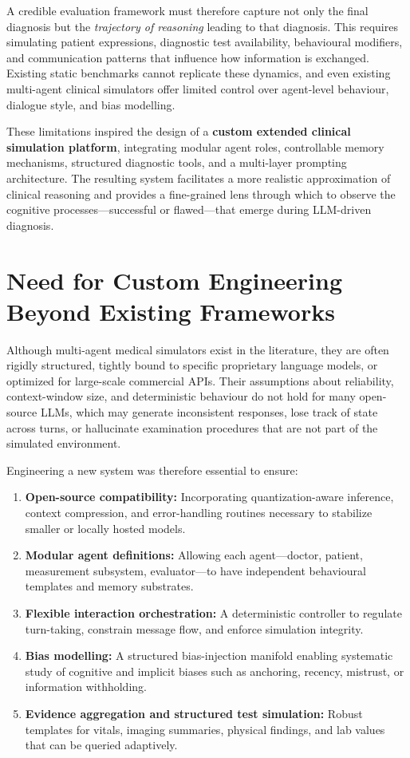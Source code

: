 A credible evaluation framework must therefore capture not only the final diagnosis but the \textit{trajectory of reasoning} leading to that diagnosis. This requires simulating patient expressions, diagnostic test availability, behavioural modifiers, and communication patterns that influence how information is exchanged. Existing static benchmarks cannot replicate these dynamics, and even existing multi-agent clinical simulators offer limited control over agent-level behaviour, dialogue style, and bias modelling.

These limitations inspired the design of a \textbf{custom extended clinical simulation platform}, integrating modular agent roles, controllable memory mechanisms, structured diagnostic tools, and a multi-layer prompting architecture. The resulting system facilitates a more realistic approximation of clinical reasoning and provides a fine-grained lens through which to observe the cognitive processes—successful or flawed—that emerge during LLM-driven diagnosis.

\section{Need for Custom Engineering Beyond Existing Frameworks}

Although multi-agent medical simulators exist in the literature, they are often rigidly structured, tightly bound to specific proprietary language models, or optimized for large-scale commercial APIs. Their assumptions about reliability, context-window size, and deterministic behaviour do not hold for many open-source LLMs, which may generate inconsistent responses, lose track of state across turns, or hallucinate examination procedures that are not part of the simulated environment.

Engineering a new system was therefore essential to ensure:

\begin{enumerate}
    \item \textbf{Open-source compatibility:} Incorporating quantization-aware inference, context compression, and error-handling routines necessary to stabilize smaller or locally hosted models.
    \item \textbf{Modular agent definitions:} Allowing each agent—doctor, patient, measurement subsystem, evaluator—to have independent behavioural templates and memory substrates.
    \item \textbf{Flexible interaction orchestration:} A deterministic controller to regulate turn-taking, constrain message flow, and enforce simulation integrity.
    \item \textbf{Bias modelling:} A structured bias-injection manifold enabling systematic study of cognitive and implicit biases such as anchoring, recency, mistrust, or information withholding.
    \item \textbf{Evidence aggregation and structured test simulation:} Robust templates for vitals, imaging summaries, physical findings, and lab values that can be queried adaptively.
\end{enumerate}

